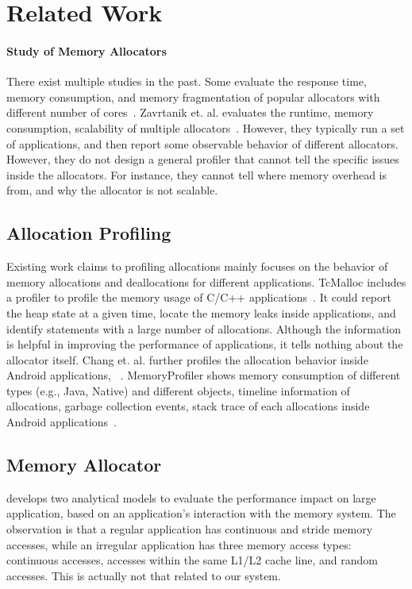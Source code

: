 \section{Related Work}

\paragraph{Study of Memory Allocators} There exist multiple studies in the past. Some evaluate the response time, memory consumption, and memory fragmentation of  popular allocators with different number of cores~\cite{6084042, ferreira2011comparison}. Zavrtanik et. al. evaluates the runtime, memory consumption, scalability of multiple allocators~\cite{zavrtanikexperimental}. However, they typically run a set of applications, and then report some observable behavior of different allocators. However, they do not design a general profiler that cannot tell the specific issues inside the allocators. For instance, they cannot tell where memory overhead is from, and why the allocator is not scalable. 


\subsection{Allocation Profiling} Existing work claims to profiling allocations mainly focuses on the behavior of memory allocations and deallocations for different applications. TcMalloc includes a profiler to profile the memory usage of C/C++ applications~\cite{ghemawat2007tcmalloc}. It could report the heap state at a given time, locate the memory leaks inside applications, and identify statements with a large number of allocations. Although the information is helpful in improving the performance of applications, it tells nothing about the allocator itself. Chang et. al. further profiles the allocation behavior inside Android applications, ~\cite{7031343}. MemoryProfiler shows memory consumption of different types (e.g., Java, Native) and different objects, timeline information of allocations, garbage collection events, stack trace of each allocations inside Android applications~\cite{MemoryProfiler}. 

\subsection{Memory Allocator}

\cite{1291361} develops two analytical models to evaluate the performance impact on large application, based on an application's interaction with the memory system. The observation is that a regular application has continuous and stride memory accesses, while an irregular application has three memory access types: continuous accesses, accesses within the same L1/L2 cache line, and random accesses. This is actually not that related to our system. 

